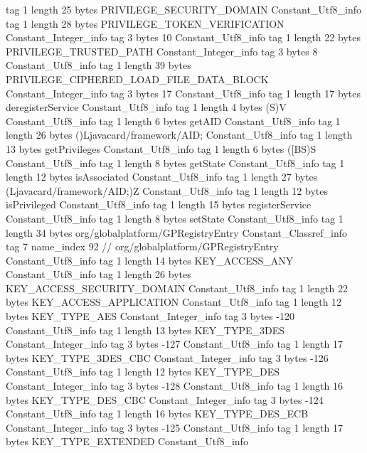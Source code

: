 {{{			tag	1
			length	25
			bytes	PRIVILEGE_SECURITY_DOMAIN
		}
		Constant_Utf8_info {
			tag	1
			length	28
			bytes	PRIVILEGE_TOKEN_VERIFICATION
		}
		Constant_Integer_info {
			tag	3
			bytes	10
		}
		Constant_Utf8_info {
			tag	1
			length	22
			bytes	PRIVILEGE_TRUSTED_PATH
		}
		Constant_Integer_info {
			tag	3
			bytes	8
		}
		Constant_Utf8_info {
			tag	1
			length	39
			bytes	PRIVILEGE_CIPHERED_LOAD_FILE_DATA_BLOCK
		}
		Constant_Integer_info {
			tag	3
			bytes	17
		}
		Constant_Utf8_info {
			tag	1
			length	17
			bytes	deregisterService
		}
		Constant_Utf8_info {
			tag	1
			length	4
			bytes	(S)V
		}
		Constant_Utf8_info {
			tag	1
			length	6
			bytes	getAID
		}
		Constant_Utf8_info {
			tag	1
			length	26
			bytes	()Ljavacard/framework/AID;
		}
		Constant_Utf8_info {
			tag	1
			length	13
			bytes	getPrivileges
		}
		Constant_Utf8_info {
			tag	1
			length	6
			bytes	([BS)S
		}
		Constant_Utf8_info {
			tag	1
			length	8
			bytes	getState
		}
		Constant_Utf8_info {
			tag	1
			length	12
			bytes	isAssociated
		}
		Constant_Utf8_info {
			tag	1
			length	27
			bytes	(Ljavacard/framework/AID;)Z
		}
		Constant_Utf8_info {
			tag	1
			length	12
			bytes	isPrivileged
		}
		Constant_Utf8_info {
			tag	1
			length	15
			bytes	registerService
		}
		Constant_Utf8_info {
			tag	1
			length	8
			bytes	setState
		}
		Constant_Utf8_info {
			tag	1
			length	34
			bytes	org/globalplatform/GPRegistryEntry
		}
		Constant_Classref_info {
			tag	7
			name_index	92		// org/globalplatform/GPRegistryEntry
		}
		Constant_Utf8_info {
			tag	1
			length	14
			bytes	KEY_ACCESS_ANY
		}
		Constant_Utf8_info {
			tag	1
			length	26
			bytes	KEY_ACCESS_SECURITY_DOMAIN
		}
		Constant_Utf8_info {
			tag	1
			length	22
			bytes	KEY_ACCESS_APPLICATION
		}
		Constant_Utf8_info {
			tag	1
			length	12
			bytes	KEY_TYPE_AES
		}
		Constant_Integer_info {
			tag	3
			bytes	-120
		}
		Constant_Utf8_info {
			tag	1
			length	13
			bytes	KEY_TYPE_3DES
		}
		Constant_Integer_info {
			tag	3
			bytes	-127
		}
		Constant_Utf8_info {
			tag	1
			length	17
			bytes	KEY_TYPE_3DES_CBC
		}
		Constant_Integer_info {
			tag	3
			bytes	-126
		}
		Constant_Utf8_info {
			tag	1
			length	12
			bytes	KEY_TYPE_DES
		}
		Constant_Integer_info {
			tag	3
			bytes	-128
		}
		Constant_Utf8_info {
			tag	1
			length	16
			bytes	KEY_TYPE_DES_CBC
		}
		Constant_Integer_info {
			tag	3
			bytes	-124
		}
		Constant_Utf8_info {
			tag	1
			length	16
			bytes	KEY_TYPE_DES_ECB
		}
		Constant_Integer_info {
			tag	3
			bytes	-125
		}
		Constant_Utf8_info {
			tag	1
			length	17
			bytes	KEY_TYPE_EXTENDED
		}
		Constant_Utf8_info {
}}}
